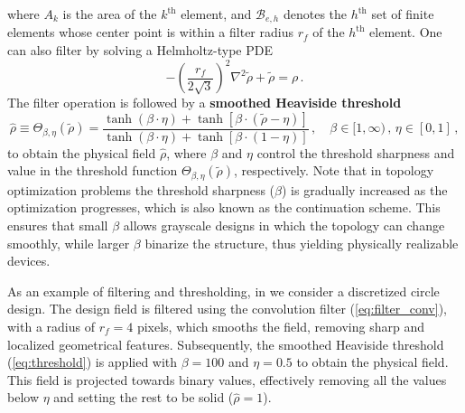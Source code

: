     where $A_k$ is the area of the $k^\text{th}$ element, and $\mathcal{B}_{e, h}$ denotes
    the
   $h^\text{th}$ set of finite elements whose center point is within a filter
    radius $r_f$ of the
   $h^\text{th}$ element. One can also filter by solving a Helmholtz-type
    PDE~\cite{PDE_filter}
       \begin{equation}
    -\left(\frac{r_f}{2 \sqrt{3}}\right)^2 \nabla^2
    \tilde{\rho}+\tilde{\rho}=\rho\,.
       \end{equation}
    The filter operation is followed by a \textbf{smoothed Heaviside
    threshold}~\cite{projection}
       \begin{equation}\label{eq:threshold}
    \hat{\rho} \equiv \Theta_{\beta,\eta}(\tilde{\rho}) =\frac{\tanh (\beta \cdot \eta)+\tanh \left[ \beta
               \cdot(\tilde{\rho}-\eta) \right]}{\tanh (\beta \cdot \eta)+\tanh \left[ \beta \cdot(1-\eta) \right]}\,,
    \quad \beta \in[1, \infty)\,,\, \eta \in[0,1]\,,
       \end{equation}
    to obtain the physical field $\hat{\rho}$, where $\beta$ and $\eta$ control the threshold sharpness and value in the 
    threshold function $\Theta_{\beta,\eta}(\tilde{\rho})$,
    respectively. Note that in topology optimization problems the threshold sharpness ($\beta$) is gradually increased as the optimization progresses, which is also known as 
    the continuation scheme. This ensures that
    small $\beta$ allows grayscale designs in which the topology can change smoothly, while larger
       $\beta$ binarize the structure, thus yielding physically realizable devices.
       
    As an example of filtering and thresholding, in 
        we consider a discretized circle design.
    The design field is filtered using the convolution filter (\eqref{eq:filter_conv}), with a radius of $r_f=4$ pixels, which smooths the field, removing sharp and localized
    geometrical features. Subsequently, the smoothed Heaviside threshold (\eqref{eq:threshold}) is applied with $\beta=100$ and $\eta=0.5$ to obtain the physical field. This field is projected towards binary 
    values, effectively removing all the values below $\eta$ and setting the rest to be solid ($\hat{\rho}=1$).
   
